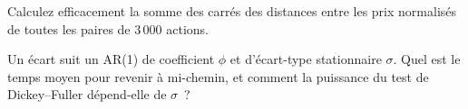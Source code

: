 \begin{interviewq}\label{iq:s1:pairs-and-baskets:5}
Calculez efficacement la somme des carrés des distances entre les prix normalisés de toutes les paires de 3\,000 actions.
\end{interviewq}

\begin{interviewq}\label{iq:s1:pairs-and-baskets:6}
Un écart suit un AR(1) de coefficient $\phi$ et d'écart-type stationnaire $\sigma$. Quel est le temps moyen pour revenir à mi-chemin, et comment
la puissance du test de Dickey--Fuller dépend-elle de $\sigma$~?
\end{interviewq}
